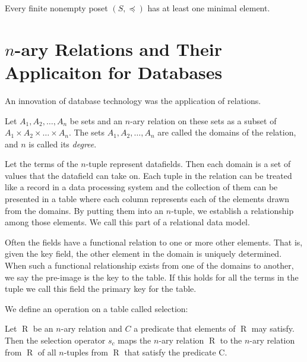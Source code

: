 \begin{lemma}\label{ExistenceOfMinimalElementInAPoset}
Every finite nonempty poset $(S,\preceq)$ has at least one minimal element.
\end{lemma}



\section{$n$-ary Relations and Their Applicaiton for Databases}
An innovation of database technology was the application of relations.

\begin{definition}
Let $A_1,A_2,\ldots,A_n$ be sets and an $n$-ary relation on these sets as a subset of $A_1\times A_2\times \ldots \times A_n$. The sets $A_1,A_2, \ldots, A_n$ are called the domains of the relation, and $n$ is called its \textit{degree}.
\end{definition}

Let the terms of the $n$-tuple represent datafields. Then each domain is a set of values that the datafield can take on. Each tuple in the relation can be treated like a record in a data processing system and the collection of them can be presented in a table where each column represents each of the elements drawn from the domains. By putting them into an $n$-tuple, we establish a relationship among those elements. We call this part of a relational data model. 

Often the fields have a functional relation to one or more other elements. That is, given the key field, the other element in the domain is uniquely determined. When such a functional relationship exists from one of the domains to another, we say the pre-image is the key to the table. If this holds for all the terms in the tuple we call this field the primary key for the table. 

We define an operation on a table called selection:
\begin{definition}
Let $\mathrel{R}$ be an $n$-ary relation and $C$ a predicate that elements of $\mathrel{R}$ may satisfy. Then the selection operator $s_c$ maps the $n$-ary relation $\mathrel{R}$ to the $n$-ary relation from $\mathrel{R}$ of all $n$-tuples from $\mathrel{R}$ that satisfy the predicate C.
\end{definition}
 
\newpage


